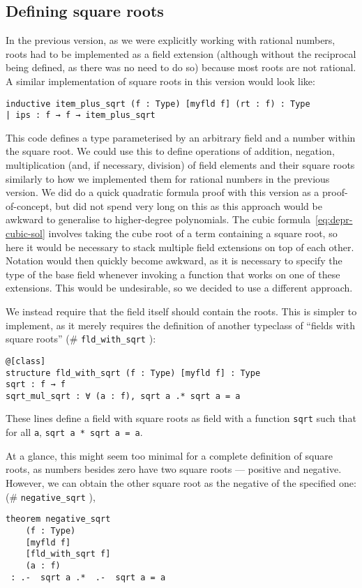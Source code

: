 \documentclass{article} %
\makeatletter
\newcommand{\linkprefix}{id:}
\newcommand{\coqdocbaseurl}{https://NicholasDyson.github.io/non-mathlib/}
\newcommand{\urlhash}{\#}
\newcommand{\coqdocurl}[2]{\coqdocbaseurl #1.html\urlhash #2}
\newcommand{\nolinkcoqident}[1]{\nolinkurl{#1}} %
\newcommand{\coqident}{\begingroup\@makeother\#\@coqident}
\newcommand{\@coqident}[3][]{%
  \ifthenelse{\isempty{#2}}%
  {\nolinkcoqident{#3}}%
  {\ifthenelse{\isempty{#1}}%
  {\href{\coqdocurl{#2}{#3}}{\color{blue}{\nolinkcoqident{\linkprefix #3}}}}%
  {\href{\coqdocurl{#2}{#3}}{\nolinkcoqident{#1}}}}%
\endgroup}
\theoremstyle{plain}
\theoremstyle{definition}
\makeatother
\begin{document}
\subsection{Defining square roots}
In the previous version, as we were explicitly working with rational numbers, roots had to be implemented as a field extension
(although without the reciprocal being defined, as there was no need to do so) because most roots are not rational.
A similar implementation of square roots in this version would look like:
\begin{lstlisting}
inductive item_plus_sqrt (f : Type) [myfld f] (rt : f) : Type
| ips : f → f → item_plus_sqrt
\end{lstlisting}
This code defines a type parameterised by an arbitrary field and a number within the square root.
We could use this to define operations of addition, negation, multiplication (and, if necessary, division)
of field elements and their square roots similarly to how we implemented them for rational numbers in the previous version.
We did do %
{a quick quadratic formula proof with this version}
as a proof-of-concept, but did not spend very long on this as this approach would be awkward to generalise to higher-degree polynomials.
The cubic formula~\eqref{eq:depr-cubic-sol} involves taking the cube root of a term containing a square root, so here it would be necessary to stack multiple field extensions on top of each other.
Notation would then quickly become awkward,
as it is necessary to specify the type of the base field whenever invoking a function that works on one of these extensions.
This would be undesirable, so we decided to use a different approach.

We instead require that the field itself should contain the roots.
This is simpler to implement, as it merely requires the definition of another typeclass of ``fields with square roots''
(\coqident{roots}{fld_with_sqrt}):
\begin{lstlisting}
@[class]
structure fld_with_sqrt (f : Type) [myfld f] : Type
sqrt : f → f
sqrt_mul_sqrt : ∀ (a : f), sqrt a .* sqrt a = a
\end{lstlisting}
These lines define a field with square roots as field with a function \lstinline!sqrt! such that for all \lstinline!a!, \lstinline!sqrt a * sqrt a = a!.

At a glance, this might seem too minimal for a complete definition of square roots,
as numbers besides zero have two square roots --- positive and negative.
However, we can obtain the other square root as the negative of the specified one:
(\coqident{roots}{negative_sqrt}),
\begin{lstlisting}
theorem negative_sqrt 
    (f : Type) 
    [myfld f] 
    [fld_with_sqrt f] 
    (a : f) 
 : .-  sqrt a .*  .-  sqrt a = a
\end{lstlisting}
\end{document}
